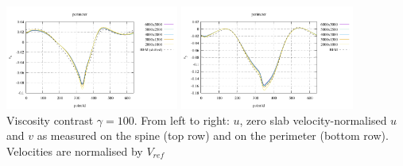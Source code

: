 \begin{center}
\includegraphics[width=5.7cm]{python_codes/fieldstone_55/gamma100/vx_perimeter2}
\includegraphics[width=5.7cm]{python_codes/fieldstone_55/gamma100/vy_perimeter}\\
{\captionfont Viscosity contrast $\gamma=100$. From left to right: $u$, zero slab velocity-normalised $u$ 
and $v$ as measured on the spine (top row) and on the perimeter (bottom row). Velocities are normalised by $V_{ref}$}
\end{center}


